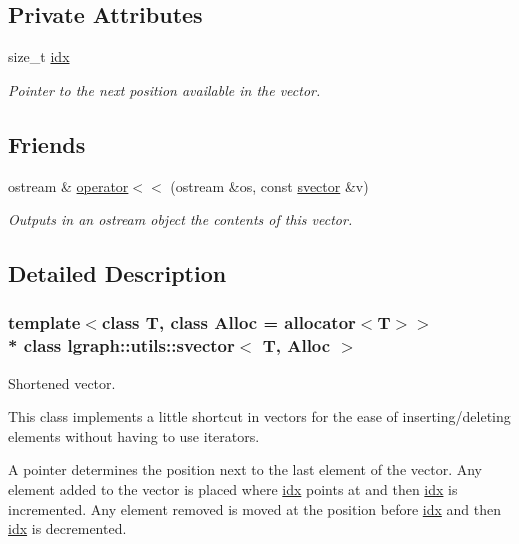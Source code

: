 \subsection*{Private Attributes}
\begin{DoxyCompactItemize}
\item 
size\+\_\+t \hyperlink{classlgraph_1_1utils_1_1svector_a7ef963c079c7dc8a6a559ceef81a241f}{idx}
\begin{DoxyCompactList}\small\item\em Pointer to the next position available in the vector. \end{DoxyCompactList}\end{DoxyCompactItemize}
\subsection*{Friends}
\begin{DoxyCompactItemize}
\item 
ostream \& \hyperlink{classlgraph_1_1utils_1_1svector_a57b29ed979371b1ad0a9ba9932f6531c}{operator$<$$<$} (ostream \&os, const \hyperlink{classlgraph_1_1utils_1_1svector}{svector} \&v)
\begin{DoxyCompactList}\small\item\em Outputs in an ostream object the contents of this vector. \end{DoxyCompactList}\end{DoxyCompactItemize}


\subsection{Detailed Description}
\subsubsection*{template$<$class T, class Alloc = allocator$<$\+T$>$$>$\\*
class lgraph\+::utils\+::svector$<$ T, Alloc $>$}

Shortened vector. 

This class implements a little shortcut in vectors for the ease of inserting/deleting elements without having to use iterators.

A pointer determines the position next to the last element of the vector. Any element added to the vector is placed where \hyperlink{classlgraph_1_1utils_1_1svector_a7ef963c079c7dc8a6a559ceef81a241f}{idx} points at and then \hyperlink{classlgraph_1_1utils_1_1svector_a7ef963c079c7dc8a6a559ceef81a241f}{idx} is incremented. Any element removed is moved at the position before \hyperlink{classlgraph_1_1utils_1_1svector_a7ef963c079c7dc8a6a559ceef81a241f}{idx} and then \hyperlink{classlgraph_1_1utils_1_1svector_a7ef963c079c7dc8a6a559ceef81a241f}{idx} is decremented.


